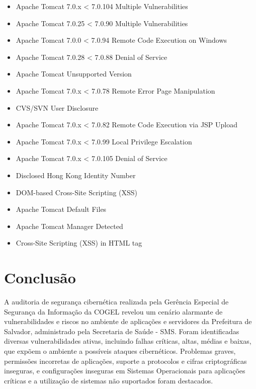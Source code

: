 \documentclass[a4paper,12pt]{article}
\begin{document}
\begin{itemize}
    \item Apache Tomcat 7.0.x < 7.0.104 Multiple Vulnerabilities
    \item Apache Tomcat 7.0.25 < 7.0.90 Multiple Vulnerabilities
    \item Apache Tomcat 7.0.0 < 7.0.94 Remote Code Execution on Windows
    \item Apache Tomcat 7.0.28 < 7.0.88 Denial of Service
    \item Apache Tomcat Unsupported Version
    \item Apache Tomcat 7.0.x < 7.0.78 Remote Error Page Manipulation
    \item CVS/SVN User Disclosure
    \item Apache Tomcat 7.0.x < 7.0.82 Remote Code Execution via JSP Upload
    \item Apache Tomcat 7.0.x < 7.0.99 Local Privilege Escalation
    \item Apache Tomcat 7.0.x < 7.0.105 Denial of Service
    \item Disclosed Hong Kong Identity Number
    \item DOM-based Cross-Site Scripting (XSS)
    \item Apache Tomcat Default Files
    \item Apache Tomcat Manager Detected
    \item Cross-Site Scripting (XSS) in HTML tag
\end{itemize}

\section{Conclusão}

A auditoria de segurança cibernética realizada pela Gerência Especial de Segurança da Informação da COGEL revelou um cenário alarmante de vulnerabilidades e riscos no ambiente de aplicações e servidores da Prefeitura de Salvador, administrado pela  Secretaria de Saúde - SMS. Foram identificadas diversas vulnerabilidades ativas, incluindo falhas críticas, altas, médias e baixas, que expõem o ambiente a possíveis ataques cibernéticos. Problemas graves, permissões incorretas de aplicações, suporte a protocolos e cifras criptográficas inseguras, e configurações inseguras em Sistemas Operacionais para aplicações críticas e a utilização de sistemas não suportados foram destacados.\\
\end{document}
